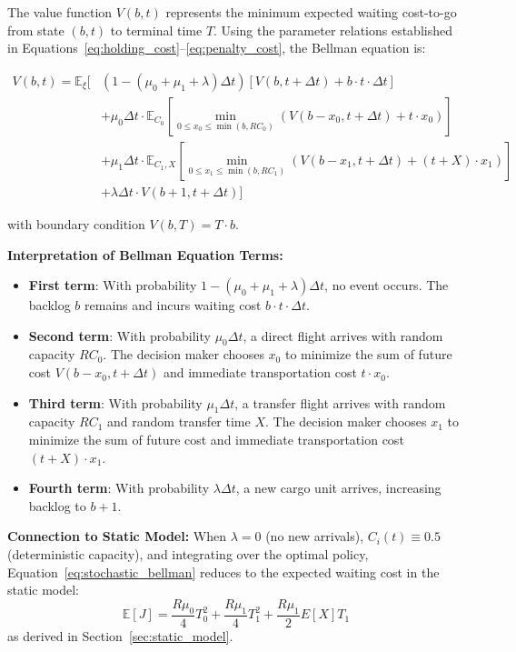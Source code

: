 \documentclass[opre,sglanonrev]{informs4}
\begin{document}
{\color{brown}
The value function \( V(b, t) \) represents the minimum expected waiting cost-to-go from state \( (b, t) \) to terminal time \( T \). Using the parameter relations established in Equations~\eqref{eq:holding_cost}--\eqref{eq:penalty_cost}, the Bellman equation is:

\begin{align}
V(b, t) = \mathbb{E}_{\xi} \bigg[ & (1 - (\mu_0 + \mu_1 + \lambda) \Delta t) \left[ V(b, t + \Delta t) + b \cdot t \cdot \Delta t \right] \nonumber \\
& + \mu_0 \Delta t \cdot \mathbb{E}_{C_0} \left[ \min_{0 \leq x_0 \leq \min(b, R C_0)} \left( V(b - x_0, t + \Delta t) + t \cdot x_0 \right) \right] \nonumber \\
& + \mu_1 \Delta t \cdot \mathbb{E}_{C_1, X} \left[ \min_{0 \leq x_1 \leq \min(b, R C_1)} \left( V(b - x_1, t + \Delta t) + (t + X) \cdot x_1 \right) \right] \nonumber \\
& + \lambda \Delta t \cdot V(b + 1, t + \Delta t) \bigg]
\label{eq:stochastic_bellman}
\end{align}

with boundary condition \( V(b, T) = T \cdot b \).

\textbf{Interpretation of Bellman Equation Terms:}
\begin{itemize}
    \item \textbf{First term}: With probability \( 1 - (\mu_0 + \mu_1 + \lambda) \Delta t \), no event occurs. The backlog \( b \) remains and incurs waiting cost \( b \cdot t \cdot \Delta t \).
    
    \item \textbf{Second term}: With probability \( \mu_0 \Delta t \), a direct flight arrives with random capacity \( R C_0 \). The decision maker chooses \( x_0 \) to minimize the sum of future cost \( V(b - x_0, t + \Delta t) \) and immediate transportation cost \( t \cdot x_0 \).
    
    \item \textbf{Third term}: With probability \( \mu_1 \Delta t \), a transfer flight arrives with random capacity \( R C_1 \) and random transfer time \( X \). The decision maker chooses \( x_1 \) to minimize the sum of future cost and immediate transportation cost \( (t + X) \cdot x_1 \).
    
    \item \textbf{Fourth term}: With probability \( \lambda \Delta t \), a new cargo unit arrives, increasing backlog to \( b + 1 \).
\end{itemize}

\textbf{Connection to Static Model:}
When \( \lambda = 0 \) (no new arrivals), \( C_i(t) \equiv 0.5 \) (deterministic capacity), and integrating over the optimal policy, Equation~\eqref{eq:stochastic_bellman} reduces to the expected waiting cost in the static model:
\[
\mathbb{E}[J] = \frac{R \mu_0}{4} T_0^2 + \frac{R \mu_1}{4} T_1^2 + \frac{R \mu_1}{2} E[X] T_1
\]
as derived in Section~\ref{sec:static_model}.
}
\end{document}
